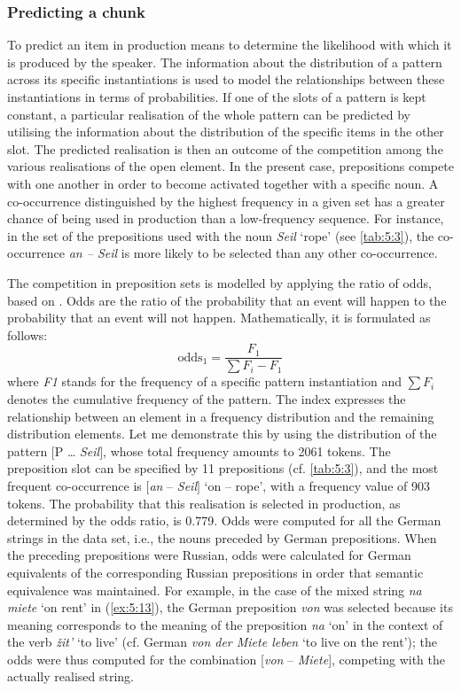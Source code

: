 \subsubsection{Predicting a chunk}{\label{odds}}

\noindent To predict an item in production means to determine the likelihood with which it is produced by the speaker. The information about the distribution of a pattern across its specific instantiations is used to model the relationships between these instantiations in terms of probabilities. If one of the slots of a pattern is kept constant, a particular realisation of the whole pattern can be predicted by utilising the information about the distribution of the specific items in the other slot. The predicted realisation is then an outcome of the competition among the various realisations of the open element. In the present case, prepositions compete with one another in order to become activated together with a specific noun. A co-occurrence distinguished by the highest frequency in a given set has a greater chance of being used in production than a low-frequency sequence. For instance, in the set of the prepositions used with the noun \textit{Seil} `rope' (see \ref{tab:5:3}), the co-occurrence \textit{an -- Seil} is more likely to be selected than any other co-occurrence.

The competition in preposition sets is modelled by applying the ratio of odds, based on \citep[119--121]{fahrmeir-etal-2007}. Odds are the ratio of the probability that an event will happen to the probability that an event will not happen. Mathematically, it is formulated as follows: \[ \text{odds}_{1} = \frac{F_{1}}{\sum F_{i}-F_{1}} \]
where \textit{F1} stands for the frequency of a specific pattern instantiation and $\sum F_{i}$ denotes the cumulative frequency of the pattern. The index expresses the relationship between an element in a frequency distribution and the remaining distribution elements. Let me demonstrate this by using the distribution of the pattern $[$P \dots{} \textit{Seil}$]$, whose total frequency amounts to 2061 tokens. The preposition slot can be specified by 11 prepositions (cf. \ref{tab:5:3}), and  the most frequent co-occurrence is $[$\textit{an} -- \textit{Seil}$]$ `on -- rope', with a frequency value of 903 tokens. The probability that this realisation is selected in production, as determined by the odds ratio, is 0.779. Odds were computed for all the German strings in the data set, i.e., the nouns preceded by German prepositions. When the preceding prepositions were Russian, odds were calculated for German equivalents of the corresponding Russian prepositions in order that semantic equivalence was maintained. For example, in the case of the mixed string \textit{na miete} `on rent' in (\ref{ex:5:13}), the German preposition \textit{von} was selected because its meaning corresponds to the meaning of the preposition \textit{na} `on' in the context of the verb \textit{žit'} `to live' (cf. German \textit{von der Miete leben} `to live on the rent'); the odds were thus computed for the combination [\textit{von}  --  \textit{Miete}], competing with the actually realised string.

